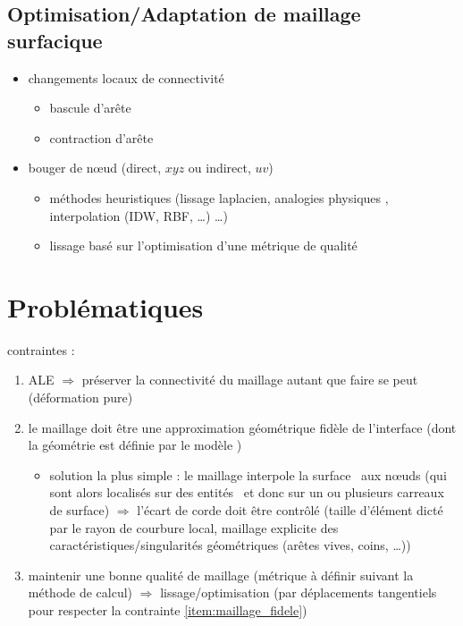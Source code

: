 \subsection{Optimisation/Adaptation de maillage surfacique}
\begin{itemize}
	\item changements locaux de connectivité
	\begin{itemize}
		\item bascule d'arête
		\item contraction d'arête
	\end{itemize}
	\item bouger de n\oe ud (direct, \ie $xyz$ ou indirect, \ie $uv$)
	\begin{itemize}
		\item méthodes heuristiques (lissage laplacien, analogies physiques \cite{farhat1998}, interpolation (IDW, RBF, \ldots) \ldots)
		\item lissage basé sur l'optimisation d'une métrique de qualité \cite{freitag1995, canann1998, jiao2008, gargallo2014}
	\end{itemize}
\end{itemize}

\section{Problématiques}
contraintes :
\begin{enumerate}
	\item ALE $\Rightarrow$ préserver la connectivité du maillage autant que faire se peut (\ie déformation pure)
	\item \label{item:maillage_fidele} le maillage doit être une approximation géométrique fidèle de l’interface (dont la géométrie  est définie par le modèle \brep)
	\begin{itemize}
		\item solution la plus simple : le maillage interpole la surface \brep\ aux n\oe uds (qui sont alors localisés sur des entités \brep\ et donc sur un ou plusieurs carreaux de surface) $\Rightarrow$ l'écart de corde doit être contrôlé (taille d'élément dicté par le rayon de courbure local, maillage explicite des caractéristiques/singularités géométriques (arêtes vives, coins, \ldots))
	\end{itemize}
	\item maintenir une bonne qualité de maillage (métrique à définir suivant la méthode de calcul) $\Rightarrow$ lissage/optimisation (par déplacements tangentiels pour respecter la contrainte \ref{item:maillage_fidele})
\end{enumerate}


